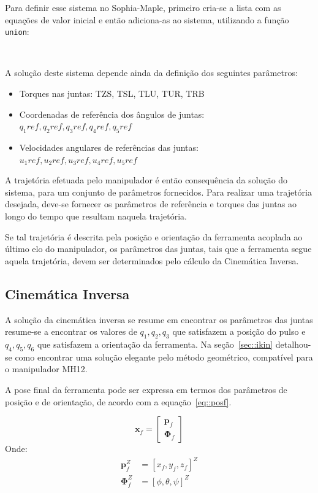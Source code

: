 Para definir esse sistema no Sophia-Maple, primeiro cria-se a lista com as
equações de valor inicial e então adiciona-as ao sistema, utilizando a função
\texttt{union}:

\bigskip {} \\ 
		  \bigskip

A solução deste sistema depende ainda da definição dos seguintes parâmetros:
%
\begin{itemize}
  \item{Torques nas juntas: TZS, TSL, TLU, TUR, TRB}
  \item{Coordenadas de referência dos ângulos de juntas: 
  		\\ $q_{1}ref, q_{2}ref, q_{3}ref, q_{4}ref, q_{5}ref$}
  \item{Velocidades angulares de referências das juntas: 
  		\\ $u_{1}ref, u_{2}ref, u_{3}ref, u_{4}ref, u_{5}ref$}
\end{itemize}
%
A trajetória efetuada pelo manipulador é então consequência da solução do
sistema, para um conjunto de parâmetros fornecidos. Para realizar uma trajetória
desejada, deve-se fornecer os parâmetros de referência e torques das juntas ao
longo do tempo que resultam naquela trajetória.

Se tal trajetória é descrita pela posição e orientação da ferramenta acoplada ao
último elo do manipulador, os parâmetros das juntas, tais que a ferramenta
segue aquela trajetória, devem ser determinados pelo cálculo da Cinemática
Inversa.


\subsection{Cinemática Inversa}\label{sec::ikin_mh12}

A solução da cinemática inversa se resume em encontrar os parâmetros das juntas
resume-se a encontrar os valores de $q_{1}, q_{2}, q_{3}$ que satisfazem a
posição do pulso e $q_{4}, q_{5}, q_{6}$ que satisfazem a orientação da
ferramenta. Na seção~\ref{sec::ikin} detalhou-se como encontrar uma solução
elegante pelo método geométrico, compatível para o manipulador MH12.

A pose final da ferramenta pode ser expressa em termos dos parâmetros
de posição e de orientação, de acordo com a equação~\ref{eq::posf}.

%
\begin{equation}
	\mathbf{x}_{f} = \begin{bmatrix}
		\mathbf{p}_{f} \\ \boldsymbol{\Phi}_{f}
	\end{bmatrix}
	\label{eq::posf}	
\end{equation}
%
Onde:
%
\begin{align}
\mathbf{p}_{f}^Z &= [x_f,y_f,z_f]^Z \\
\boldsymbol{\Phi}_{f}^Z &= [\phi,\theta,\psi]^Z
\end{align}
%



